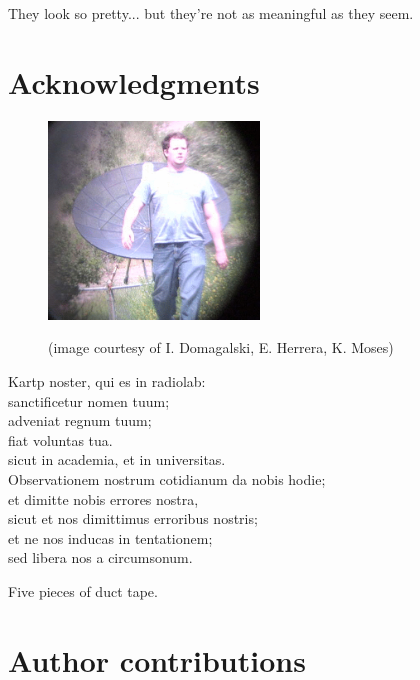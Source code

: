 \documentclass[10pt]{article}
\begin{document}
They look so pretty... but they're not as meaningful as they seem.

\section{Acknowledgments}

\begin{figure}[!ht]
    \centering
    \includegraphics[width=0.5\textwidth]{kartp2.png} \\
    \caption{(image courtesy of I. Domagalski, E. Herrera, K. Moses)}
    \label{fig:kartp2}
\end{figure}

\begin{center}
Kartp noster, qui es in radiolab:\\
sanctificetur nomen tuum;\\
adveniat regnum tuum;\\
fiat voluntas tua.\\
sicut in academia, et in universitas.\\
Observationem nostrum cotidianum da nobis hodie;\\
et dimitte nobis errores nostra,\\
sicut et nos dimittimus erroribus nostris;\\
et ne nos inducas in tentationem;\\
sed libera nos a circumsonum.
\end{center}

Five pieces of duct tape.


\section{Author contributions}
\end{document}
